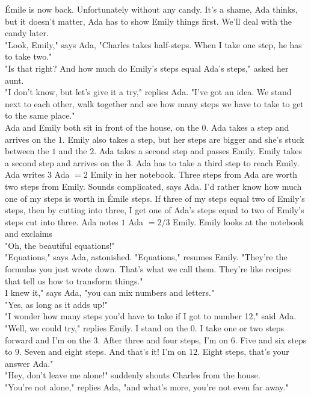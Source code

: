 Émile is now back. Unfortunately without any candy. It's a shame, Ada thinks, but it doesn't matter, Ada has to show Emily things first. We'll deal with the candy later.\\
"Look, Emily," says Ada, "Charles takes half-steps. When I take one step, he has to take two."\\
"Is that right? And how much do Emily's steps equal Ada's steps," asked her aunt.\\
"I don't know, but let's give it a try," replies Ada. "I've got an idea. We stand next to each other, walk together and see how many steps we have to take to get to the same place."\\
Ada and Emily both sit in front of the house, on the $0$. Ada takes a step and arrives on the $1$. Emily also takes a step, but her steps are bigger and she's stuck between the $1$ and the $2$.
Ada takes a second step and passes Emily. Emily takes a second step and arrives on the $3$. Ada has to take a third step to reach Emily.
Ada writes $3$ Ada $= 2$ Emily in her notebook. Three steps from Ada are worth two steps from Emily. Sounds complicated, says Ada. I'd rather know how much one of my steps is worth in Émile steps. If three of my steps equal two of Emily's steps, then by cutting into three, I get one of Ada's steps equal to two of Emily's steps cut into three. Ada notes $1$ Ada $= 2/3$ Emily.
Emily looks at the notebook and exclaims\\
"Oh, the beautiful equations!"\\
"Equations," says Ada, astonished.
"Equations," resumes Emily. "They're the formulas you just wrote down. That's what we call them. They're like recipes that tell us how to transform things."\\
I knew it," says Ada, "you can mix numbers and letters."\\
"Yes, as long as it adds up!"\\
"I wonder how many steps you'd have to take if I got to number 12," said Ada.\\
"Well, we could try," replies Emily. I stand on the $0$. I take one or two steps forward and I'm on the $3$. After three and four steps, I'm on $6$. Five and six steps to $9$. Seven and eight steps. And that's it! I'm on $12$. Eight steps, that's your answer Ada."\\
"Hey, don't leave me alone!" suddenly shouts Charles from the house.\\
"You're not alone," replies Ada, "and what's more, you're not even far away."\\
